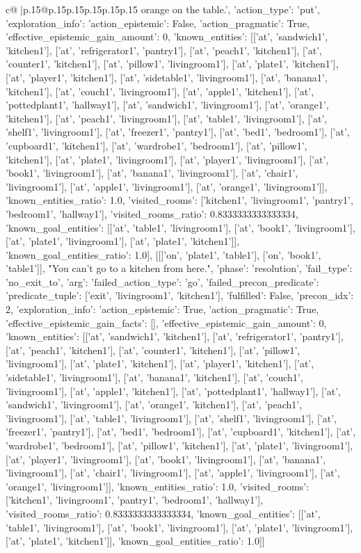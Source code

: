 \documentclass{article}
\begin{document}
{\begin{supertabular}{c@{$\;$}|p{.15\linewidth}@{}p{.15\linewidth}p{.15\linewidth}p{.15\linewidth}p{.15\linewidth}p{.15\linewidth}}
{{{orange on the table.\n', {'action_type': 'put', 'exploration_info': {'action_epistemic': False, 'action_pragmatic': True, 'effective_epistemic_gain_amount': 0, 'known_entities': [['at', 'sandwich1', 'kitchen1'], ['at', 'refrigerator1', 'pantry1'], ['at', 'peach1', 'kitchen1'], ['at', 'counter1', 'kitchen1'], ['at', 'pillow1', 'livingroom1'], ['at', 'plate1', 'kitchen1'], ['at', 'player1', 'kitchen1'], ['at', 'sidetable1', 'livingroom1'], ['at', 'banana1', 'kitchen1'], ['at', 'couch1', 'livingroom1'], ['at', 'apple1', 'kitchen1'], ['at', 'pottedplant1', 'hallway1'], ['at', 'sandwich1', 'livingroom1'], ['at', 'orange1', 'kitchen1'], ['at', 'peach1', 'livingroom1'], ['at', 'table1', 'livingroom1'], ['at', 'shelf1', 'livingroom1'], ['at', 'freezer1', 'pantry1'], ['at', 'bed1', 'bedroom1'], ['at', 'cupboard1', 'kitchen1'], ['at', 'wardrobe1', 'bedroom1'], ['at', 'pillow1', 'kitchen1'], ['at', 'plate1', 'livingroom1'], ['at', 'player1', 'livingroom1'], ['at', 'book1', 'livingroom1'], ['at', 'banana1', 'livingroom1'], ['at', 'chair1', 'livingroom1'], ['at', 'apple1', 'livingroom1'], ['at', 'orange1', 'livingroom1']], 'known_entities_ratio': 1.0, 'visited_rooms': ['kitchen1', 'livingroom1', 'pantry1', 'bedroom1', 'hallway1'], 'visited_rooms_ratio': 0.8333333333333334, 'known_goal_entities': [['at', 'table1', 'livingroom1'], ['at', 'book1', 'livingroom1'], ['at', 'plate1', 'livingroom1'], ['at', 'plate1', 'kitchen1']], 'known_goal_entities_ratio': 1.0}}], [[['on', 'plate1', 'table1'], ['on', 'book1', 'table1']], "You can't go to a kitchen from here.\n", {'phase': 'resolution', 'fail_type': 'no_exit_to', 'arg': {'failed_action_type': 'go', 'failed_precon_predicate': {'predicate_tuple': ['exit', 'livingroom1', 'kitchen1'], 'fulfilled': False, 'precon_idx': 2}}, 'exploration_info': {'action_epistemic': True, 'action_pragmatic': True, 'effective_epistemic_gain_facts': [], 'effective_epistemic_gain_amount': 0, 'known_entities': [['at', 'sandwich1', 'kitchen1'], ['at', 'refrigerator1', 'pantry1'], ['at', 'peach1', 'kitchen1'], ['at', 'counter1', 'kitchen1'], ['at', 'pillow1', 'livingroom1'], ['at', 'plate1', 'kitchen1'], ['at', 'player1', 'kitchen1'], ['at', 'sidetable1', 'livingroom1'], ['at', 'banana1', 'kitchen1'], ['at', 'couch1', 'livingroom1'], ['at', 'apple1', 'kitchen1'], ['at', 'pottedplant1', 'hallway1'], ['at', 'sandwich1', 'livingroom1'], ['at', 'orange1', 'kitchen1'], ['at', 'peach1', 'livingroom1'], ['at', 'table1', 'livingroom1'], ['at', 'shelf1', 'livingroom1'], ['at', 'freezer1', 'pantry1'], ['at', 'bed1', 'bedroom1'], ['at', 'cupboard1', 'kitchen1'], ['at', 'wardrobe1', 'bedroom1'], ['at', 'pillow1', 'kitchen1'], ['at', 'plate1', 'livingroom1'], ['at', 'player1', 'livingroom1'], ['at', 'book1', 'livingroom1'], ['at', 'banana1', 'livingroom1'], ['at', 'chair1', 'livingroom1'], ['at', 'apple1', 'livingroom1'], ['at', 'orange1', 'livingroom1']], 'known_entities_ratio': 1.0, 'visited_rooms': ['kitchen1', 'livingroom1', 'pantry1', 'bedroom1', 'hallway1'], 'visited_rooms_ratio': 0.8333333333333334, 'known_goal_entities': [['at', 'table1', 'livingroom1'], ['at', 'book1', 'livingroom1'], ['at', 'plate1', 'livingroom1'], ['at', 'plate1', 'kitchen1']], 'known_goal_entities_ratio': 1.0}}]]
}}}
\end{supertabular}}
\end{document}

